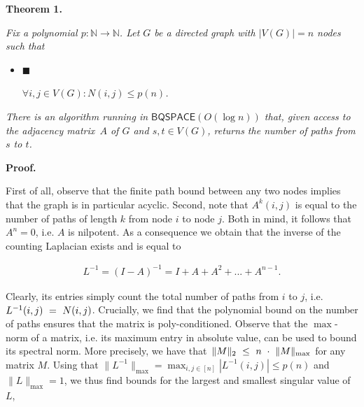 

\par\medskip\noindent\textbf{
\textbf{Theorem 1}\textbf{.}
}\par



\emph{Fix a polynomial $p:\mathbb{N}\rightarrow\mathbb{N}$.
Let $G$ be a directed graph with $|V(G)|=n$ nodes such that}\par


\begin{itemize}


\item[] 
$\blacksquare$ 


$\forall i,j\in V(G):N(i,j)\leq p(n)$\emph{.}\par





\end{itemize}


\emph{There is an algorithm running in $\mathsf{BQSPACE}(O(\log n))$ that, given access to the adjacency matrix $A$ of $G$ and $s,t\in V(G)$, returns the number of paths from $s$ to $t$.}\par






\par\medskip\noindent\textbf{Proof.}\par




First of all, observe that the finite path bound between any two nodes implies that the graph is in particular acyclic.
Second, note that $A^{k}(i,j)$ is equal to the number of paths of length $k$ from node $i$ to node $j$.
Both in mind, it follows that $A^{n}=0$, i.e. $A$ is nilpotent.
As a consequence we obtain that the inverse of the counting Laplacian exists and is equal to\par


\[\begin{gathered}
L^{-1}=(I-A)^{-1}=I+A+A^{2}+...+A^{n-1}.
\end{gathered}\]


Clearly, its entries simply count the total number of paths from $i$ to $j$, i.e. $L^{-1}(i,j)\nobreak\ =\nobreak\ N(i,j)$.
Crucially, we find that the polynomial bound on the number of paths ensures that the matrix is poly-conditioned.
Observe that the $\max$-norm of a matrix, i.e. its maximum entry in absolute value, can be used to bound its spectral norm. More precisely, we have that $\|M\|_{2}\nobreak\ \leq\nobreak\ n\nobreak\ \cdot\nobreak\ \|M\|_{\max}$ for any matrix $M$.
Using that $\|L^{-1}\|_{\max}=\max_{i,j\in[n]}|L^{-1}(i,j)|\leq p(n)$ and $\|L\|_{\max}=1$, we thus find bounds for the largest and smallest singular value of $L$,\par




